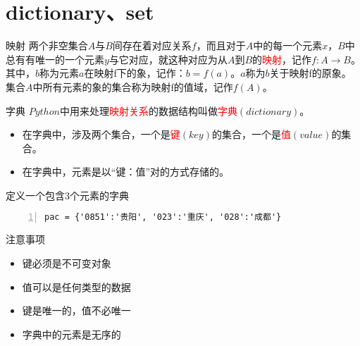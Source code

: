 \documentclass{beamer}
\begin{document}
\section{dictionary、set}
\begin{frame}{映射}
两个非空集合$A$与$B$间存在着对应关系$f$，而且对于$A$中的每一个元素$x$，$B$中总有有唯一的一个元素$y$与它对应，就这种对应为从$A$到$B$的\textcolor{red}{映射}，记作$f: A→B$。其中，$b$称为元素$a$在映射f下的象，记作：$b=f(a)$。$a$称为$b$关于映射f的原象。集合$A$中所有元素的象的集合称为映射f的值域，记作$f(A)$。
\end{frame}
\begin{frame}[fragile]{字典}
$Python$中用来处理\textcolor{red}{映射关系}的数据结构叫做\textcolor{red}{字典}$(dictionary)$。
\begin{itemize}
\item
在字典中，涉及两个集合，一个是\textcolor{red}{键}$(key)$的集合，一个是\textcolor{red}{值}$(value)$的集合。
\item
在字典中，元素是以“键：值”对的方式存储的。
\end{itemize}
\begin{block}{定义一个包含3个元素的字典}
\begin{Verbatim}[numbers=left,frame=single,rulecolor=\color{red}]
pac = {'0851':'贵阳', '023':'重庆', '028':'成都'}
\end{Verbatim}
\end{block}
\begin{block}{注意事项}
\begin{itemize}
\item 键必须是不可变对象
\item 值可以是任何类型的数据
\item 键是唯一的，值不必唯一
\item 字典中的元素是无序的
\end{itemize}

\end{block}
\end{frame}
\end{document}
